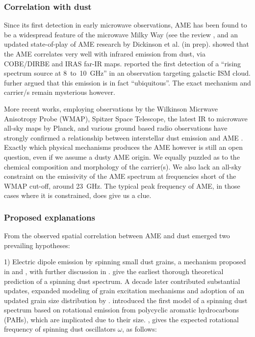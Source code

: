     \subsubsection{Correlation with dust}

     Since its first detection in early microwave observations, AME has been found to be a widespread feature of the microwave Milky Way (see the review \cite{dickinson13r}, and an updated state-of-play of AME research by Dickinson et al. (in prep). \cite{kogut96,deoliveiracosta97} showed that the AME correlates very well with infrared emission from dust, via COBE/DIRBE and IRAS far-IR maps.  \cite{finkbeiner02} reported the first detection of a ``rising spectrum source at 8~to~10~GHz'' in an observation targeting galactic ISM cloud. \cite{deoliveiracosta02} furher argued that this emission is in fact ``ubiquitous''. The exact mechanism and carrier/s remain mysterious however.

    More recent works, employing observations by the Wilkinson Micrwave Anisotropy Probe (WMAP), Spitzer Space Telescope, the latest IR to microwave all-sky maps by Planck, and various ground based radio observations have strongly confirmed a relationship between interstellar dust emission and AME \citep{ysard10a,tibbs11,hensley16}. Exactly which physical mechanisms produces the AME however is still an open question, even if we assume a dusty AME origin. We equally puzzled as to the chemical composition and morphology of the carrier(s). We also lack an all-sky constraint on the emissivity of the AME spectrum at frequencies short of the WMAP cut-off, around 23~GHz. The typical peak frequency of AME, in those cases where it is constrained, does give us a clue.

  \subsubsection{Proposed explanations}

     From the observed spatial correlation between AME and dust emerged two prevailing hypotheses:

    1) Electric dipole emission by spinning small dust grains, a mechanism proposed in \cite{erickson57} and \cite{hoyle70}, with further discussion in \cite{ferrara94}. \cite{draine98b} give the earliest thorough theoretical prediction of a spinning dust spectrum. A decade later \cite{ali-haimoud09} contributed substantial updates, expanded modeling of grain excitation mechanisms and adoption of an updated grain size distribution by \cite{weingartner01}. \cite{ysard10a} introduced the first model of a spinning dust spectrum based on rotational emission from polycyclic aromatic hydrocarbons (PAHs), which are implicated due to their size.  \cite{draine98b}, gives the expected rotational frequency of spinning dust oscillators $\omega$,  as follows:

